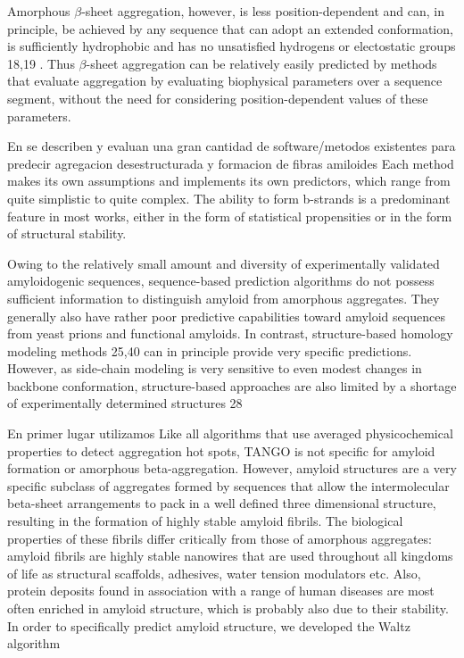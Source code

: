 Amorphous $\beta$-sheet aggregation, however, is less position-dependent and can, in principle, be achieved by any sequence that
can adopt an extended conformation, is sufficiently hydrophobic and has no unsatisfied hydrogens or electostatic groups 18,19 . Thus
$\beta$-sheet aggregation can be relatively easily predicted by methods that evaluate aggregation by evaluating biophysical parameters
over a sequence segment, without the need for considering position-dependent values of these parameters.


En  \cite{hamodrakas2011protein,redler2014computational,agrawal2011aggregation} se describen y evaluan una gran cantidad de software/metodos existentes para predecir agregacion desestructurada y formacion de fibras amiloides
Each method makes its own assumptions and implements its own predictors, which range from quite simplistic to quite complex. 
The ability to form b-strands is a predominant feature in most works, either in the form of statistical propensities or in the form of structural stability.



Owing to the relatively small amount
and diversity of experimentally validated amyloidogenic sequences,
sequence-based prediction algorithms do not possess sufficient
information to distinguish amyloid from amorphous aggregates.
They generally also have rather poor predictive capabilities toward
amyloid sequences from yeast prions and functional amyloids. In
contrast, structure-based homology modeling methods 25,40 can in
principle provide very specific predictions. However, as side-chain
modeling is very sensitive to even modest changes in backbone
conformation, structure-based approaches are also limited by a
shortage of experimentally determined structures 28






En primer lugar utilizamos 
Like all algorithms that use averaged physicochemical properties to detect aggregation hot spots, TANGO is not specific for amyloid formation or amorphous beta-aggregation. 
However, amyloid structures are a very specific subclass of aggregates formed by sequences that allow the intermolecular beta-sheet arrangements to pack in a well defined three dimensional structure,
resulting in the formation of highly stable amyloid fibrils.
The biological properties of these fibrils differ critically from those of amorphous aggregates: amyloid fibrils are highly stable nanowires that are used throughout all kingdoms of life as structural scaffolds, 
adhesives, water tension modulators etc. 
Also, protein deposits found in association with a range of human diseases are most often enriched in amyloid structure, which is probably also due to their stability. 
In order to specifically predict amyloid structure, we developed the Waltz algorithm


